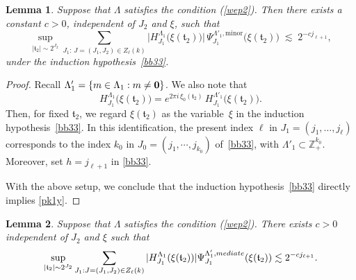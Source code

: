 \documentclass[10pt,a4paper]{amsart}
\newtheorem{lemma}{Lemma}\numberwithin{lemma}{section}
\numberwithin{equation}{section}
\begin{document}
\begin{lemma}\label{prop130y}
Suppose that $\Lambda$ satisfies   the  condition (\ref{wep2}). Then there exists a constant $c>0$, independent of $J_2$ and $\xi$, such that
\begin{equation}\label{pk1y}
\sup_{|\mathfrak{t}_2|\sim 2^{J_2}}
\sum_{J_1:\, J=(J_1,J_2)\in Z_\ell(k)}
\bigl| H^{\Lambda_{1}}_{J_1}\bigl( \xi(\mathfrak{t}_2) \bigr) \bigr|\,
\Psi^{\Lambda'_1,\mathrm{minor}}_{J_1}\bigl(\xi(\mathfrak{t}_2)\bigr)
\;\lesssim\;
2^{-c j_{\ell+1}}, 
\end{equation}under the  induction hypothesis~\eqref{bb33}.
\end{lemma}

\begin{proof}
Recall $\Lambda'_{1}=\{m\in\Lambda_{1}:m\neq {\bf 0}\}$.  We also note that
\[
H^{\Lambda_{1}}_{J_1}\bigl(\xi(\mathfrak{t}_2)\bigr)
=
e^{2\pi i\, \xi_{0}(\mathfrak{t}_2)}\,
H^{\Lambda'_{1}}_{J_1}\bigl(\xi(\mathfrak{t}_2)\bigr).
\]
Then, for fixed $\mathfrak{t}_2$, we regard $\xi(\mathfrak{t}_2)$ as the variable~$\xi$ in the induction hypothesis~\eqref{bb33}.  
In this identification, the present index $\ell$ in $J_1=(j_1,\dots,j_\ell)$ corresponds to the index $k_0$ in $J_0=(j_1,\cdots,j_{k_0})$ of~\eqref{bb33}, with $\Lambda'_1 \subset \mathbb{Z}_+^{k_0}$. Moreover, set $h = j_{\ell+1}$  in \eqref{bb33}.

With the above setup, we conclude that 
the induction hypothesis~\eqref{bb33}  directly implies \eqref{pk1y}.
\end{proof}


 
\begin{lemma}\label{prop41y}
Suppose that $\Lambda$ satisfies   the  condition (\ref{wep2}).  There exists  $c>0$  independent of $J_2$ and $\xi$ such that
\begin{align}\label{32y}
\sup_{|\mathfrak{t}_2|\sim 2^{J_2}}\sum_{J_1: J=(J_1,J_2)\in Z_\ell(k)}   |H^{\Lambda_{1}}_{J_1}( \xi(\mathfrak{t}_2))|  \Psi^{\Lambda'_1,\rm{mediate}}_{J_1}(\xi(\mathfrak{t}_2))  \lesssim 2^{-cj_{\ell+1}}. 
\end{align}
\end{lemma}
 
\end{document}
